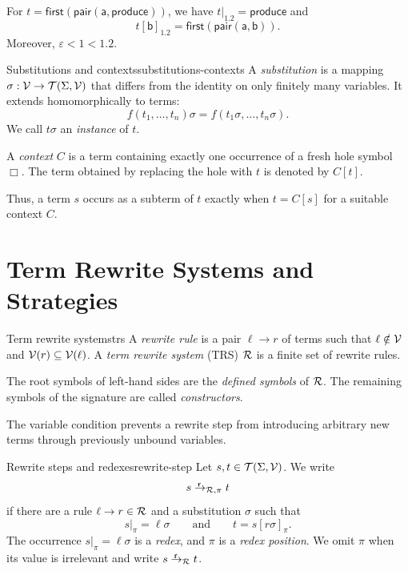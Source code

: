 For
$t=\mathsf{first}(\mathsf{pair}(\mathsf a,\mathsf{produce}))$, we have
$t|_{1.2}=\mathsf{produce}$ and
\[
  t[\mathsf b]_{1.2}
  =\mathsf{first}(\mathsf{pair}(\mathsf a,\mathsf b)).
\]
Moreover, $\varepsilon<1<1.2$.

\begin{Definition}{Substitutions and contexts}{substitutions-contexts}
  A \emph{substitution} is a mapping
  $\sigma:\mathcal{V}\to\mathcal{T}\!\left(\Sigma,\mathcal{V}\right)$ that differs from the identity on only
  finitely many variables.  It extends homomorphically to terms:
  \[
    f(t_1,\ldots,t_n)\sigma
      =f(t_1\sigma,\ldots,t_n\sigma).
  \]
  We call $t\sigma$ an \emph{instance} of $t$.

  A \emph{context} $C$ is a term containing exactly one occurrence of a fresh
  hole symbol $\Box$.  The term obtained by replacing the hole with $t$ is
  denoted by $C[t]$.
\end{Definition}

Thus, a term $s$ occurs as a subterm of $t$ exactly when $t=C[s]$ for a suitable
context $C$.

\section{Term Rewrite Systems and Strategies}\label{sec:trs-strategies}

\begin{Definition}{Term rewrite systems}{trs}
  A \emph{rewrite rule} is a pair $\ell\to r$ of terms such that
  $\ell\notin\mathcal{V}$ and $\mathcal{V}(r)\subseteq\mathcal{V}(\ell)$.  A \emph{term rewrite
  system} (TRS) $\mathcal{R}$ is a finite set of rewrite rules.

  The root symbols of left-hand sides are the \emph{defined symbols} of
  $\mathcal{R}$.  The remaining symbols of the signature are called
  \emph{constructors}.
\end{Definition}

The variable condition prevents a rewrite step from introducing arbitrary new
terms through previously unbound variables.

\begin{Definition}{Rewrite steps and redexes}{rewrite-step}
  Let $s,t\in\mathcal{T}\!\left(\Sigma,\mathcal{V}\right)$.  We write
  \[
    s\fto_{\R,\pi}t
  \]
  if there are a rule $\ell\to r\in\mathcal{R}$ and a substitution $\sigma$ such that
  \[
    s|_\pi=\ell\sigma
    \qquad\text{and}\qquad
    t=s[r\sigma]_\pi.
  \]
  The occurrence $s|_\pi=\ell\sigma$ is a \emph{redex}, and $\pi$ is a
  \emph{redex position}.  We omit $\pi$ when its value is irrelevant and
  write $s\fto_\R t$.
\end{Definition}

